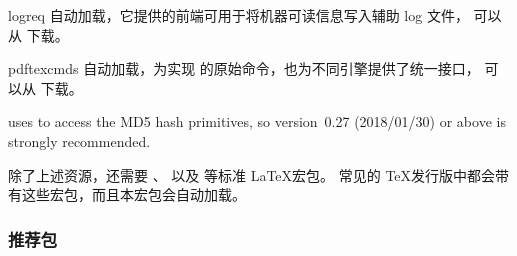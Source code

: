 \begin{marglist}
\item[logreq]
自动加载，它提供的前端可用于将机器可读信息写入辅助 log 文件，
可以从  下载。


\item[pdftexcmds]
自动加载，为\luatex 实现 \pdftex 的原始命令，也为不同引擎提供了统一接口，
可以从  下载。

\biblatex uses  to access the MD5 hash primitives, so version~0.27 (2018/01/30) or above is strongly recommended.




\end{marglist}


除了上述资源，\biblatex 还需要 、 以及  等标准 \LaTeX 宏包。
常见的 \TeX 发行版中都会带有这些宏包，而且本宏包会自动加载。

\subsubsection{推荐包}
\label{int:pre:rec}


